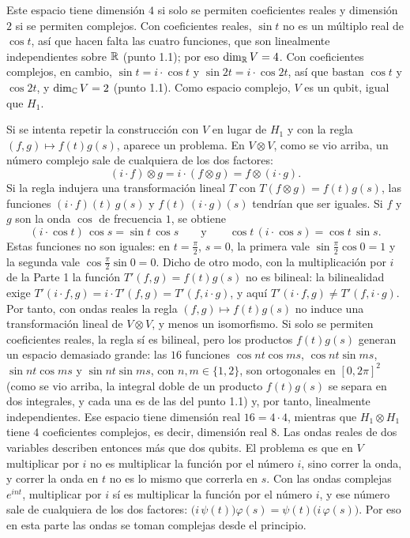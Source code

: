 Este espacio tiene dimensión $4$ si solo se permiten coeficientes reales y dimensión $2$ si se permiten complejos. Con coeficientes reales, $\sin t$ no es un múltiplo real de $\cos t$, así que hacen falta las cuatro funciones, que son linealmente independientes sobre $\mathbb{R}$ (punto 1.1); por eso $\dim_{\mathbb{R}}V=4$. Con coeficientes complejos, en cambio, $\sin t=i\cdot\cos t$ y $\sin 2t=i\cdot\cos 2t$, así que bastan $\cos t$ y $\cos 2t$, y $\dim_{\mathbb{C}}V=2$ (punto 1.1). Como espacio complejo, $V$ es un qubit, igual que $H_1$.

Si se intenta repetir la construcción con $V$ en lugar de $H_1$ y con la regla $(f,g)\mapsto f(t)g(s)$, aparece un problema. En $V\otimes V$, como se vio arriba, un número complejo sale de cualquiera de los dos factores:
\[
  (i\cdot f)\otimes g=i\cdot(f\otimes g)=f\otimes(i\cdot g).
\]
Si la regla indujera una transformación lineal $T$ con $T(f\otimes g)=f(t)g(s)$, las funciones $(i\cdot f)(t)\,g(s)$ y $f(t)\,(i\cdot g)(s)$ tendrían que ser iguales. Si $f$ y $g$ son la onda $\cos$ de frecuencia $1$, se obtiene
\[
  (i\cdot\cos t)\,\cos s=\sin t\,\cos s
  \qquad\text{y}\qquad
  \cos t\,(i\cdot\cos s)=\cos t\,\sin s .
\]
Estas funciones no son iguales: en $t=\frac\pi2$, $s=0$, la primera vale $\sin\frac\pi2\cos0=1$ y la segunda vale $\cos\frac\pi2\sin0=0$. Dicho de otro modo, con la multiplicación por $i$ de la Parte 1 la función $T'(f,g)=f(t)g(s)$ no es bilineal: la bilinealidad exige $T'(i\cdot f,g)=i\cdot T'(f,g)=T'(f,i\cdot g)$, y aquí $T'(i\cdot f,g)\neq T'(f,i\cdot g)$. Por tanto, con ondas reales la regla $(f,g)\mapsto f(t)g(s)$ no induce una transformación lineal de $V\otimes V$, y menos un isomorfismo. Si solo se permiten coeficientes reales, la regla sí es bilineal, pero los productos $f(t)g(s)$ generan un espacio demasiado grande: las $16$ funciones $\cos nt\cos ms$, $\cos nt\sin ms$, $\sin nt\cos ms$ y $\sin nt\sin ms$, con $n,m\in\{1,2\}$, son ortogonales en $[0,2\pi]^2$ (como se vio arriba, la integral doble de un producto $f(t)g(s)$ se separa en dos integrales, y cada una es de las del punto 1.1) y, por tanto, linealmente independientes. Ese espacio tiene dimensión real $16=4\cdot4$, mientras que $H_1\otimes H_1$ tiene $4$ coeficientes complejos, es decir, dimensión real $8$. Las ondas reales de dos variables describen entonces más que dos qubits. El problema es que en $V$ multiplicar por $i$ no es multiplicar la función por el número $i$, sino correr la onda, y correr la onda en $t$ no es lo mismo que correrla en $s$. Con las ondas complejas $e^{int}$, multiplicar por $i$ sí es multiplicar la función por el número $i$, y ese número sale de cualquiera de los dos factores: $\bigl(i\,\psi(t)\bigr)\varphi(s)=\psi(t)\bigl(i\,\varphi(s)\bigr)$. Por eso en esta parte las ondas se toman complejas desde el principio.
